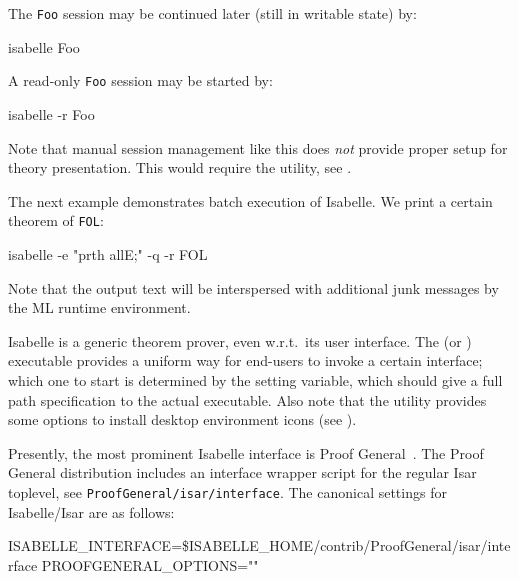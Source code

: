 \begin{isabellebody}
\begin{isamarkuptext}
  The \verb|Foo| session may be continued later (still in
  writable state) by:
\begin{ttbox}
isabelle Foo
\end{ttbox}
  A read-only \verb|Foo| session may be started by:
\begin{ttbox}
isabelle -r Foo
\end{ttbox}

  \medskip Note that manual session management like this does
  \emph{not} provide proper setup for theory presentation.  This would
  require the \hyperlink{tool.usedir}{\mbox{}} utility, see .

  \bigskip The next example demonstrates batch execution of
  Isabelle. We print a certain theorem of \verb|FOL|:
\begin{ttbox}
isabelle -e "prth allE;" -q -r FOL
\end{ttbox}
  Note that the output text will be interspersed with additional junk
  messages by the ML runtime environment.%
\end{isamarkuptext}%
\isamarkuptrue%
%
\isamarkuptrue%
%
\begin{isamarkuptext}%
Isabelle is a generic theorem prover, even w.r.t.\ its user
  interface.  The \hyperlink{executable.Isabelle}{\mbox{}} (or \hyperlink{executable.isabelle-interface}{\mbox{}}) executable provides a uniform way for
  end-users to invoke a certain interface; which one to start is
  determined by the \hyperlink{setting.ISABELLE-INTERFACE}{\mbox{}} setting
  variable, which should give a full path specification to the actual
  executable.  Also note that the \hyperlink{tool.install}{\mbox{}} utility provides
  some options to install desktop environment icons (see
  ).

  Presently, the most prominent Isabelle interface is Proof
  General~\cite{proofgeneral}.
  The Proof General distribution includes an interface wrapper script
  for the regular Isar toplevel, see \verb|ProofGeneral/isar/interface|.  The canonical settings for
  Isabelle/Isar are as follows:

\begin{ttbox}
ISABELLE_INTERFACE=\$ISABELLE_HOME/contrib/ProofGeneral/isar/interface
PROOFGENERAL_OPTIONS=""
\end{ttbox}


\end{isamarkuptext}
\end{isabellebody}
